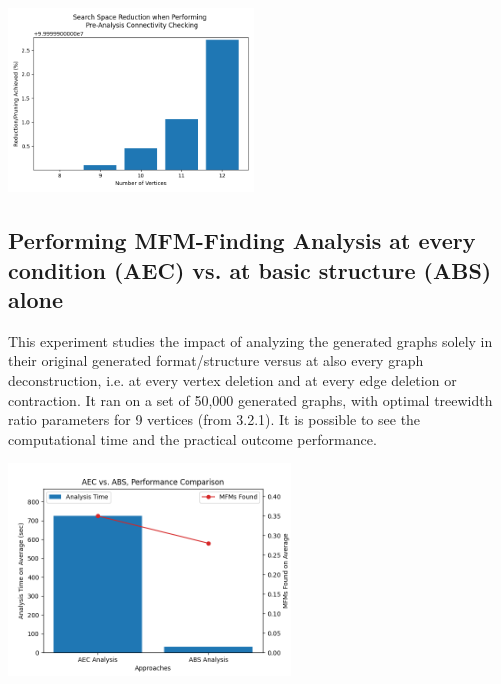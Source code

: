 \includegraphics[width=6.5cm]{images/conn_pruning.png}

\subsection{Performing MFM-Finding Analysis at every condition (AEC) vs. at basic structure (ABS) alone}
This experiment studies the impact of analyzing the generated graphs solely in their original generated format/structure versus at also every graph deconstruction, i.e. at every vertex deletion and at every edge deletion or contraction. It ran on a set of 50,000 generated graphs, with optimal treewidth ratio parameters for 9 vertices (from 3.2.1). It is possible to see the computational time and the practical outcome performance.

\includegraphics[width=7.5cm]{images/aec_vs_abs.png}


